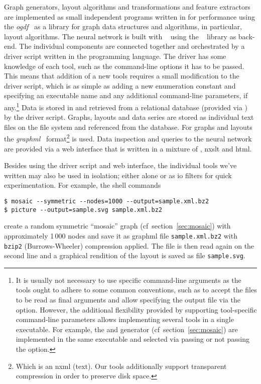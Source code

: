 \documentclass{graphstudy}
\begin{document}
Graph generators, layout algorithms and transformations and feature extractors are implemented as small independent
programs written in {\CXX} for performance using the \emph{\acf{ogdf}}~\cite{OGDF} as a library for graph data
structures and algorithms, in particular, layout algorithms.  The neural network is built with \Keras~\cite{Keras} using
the \TensorFlow~\cite{TensorFlow} library as back-end.  The individual components are connected together and
orchestrated by a driver script written in the {\Python} programming language.  The driver has some knowledge of each
tool, such as the command-line options it has to be passed.  This means that addition of a new tools requires a small
modification to the driver script, which is as simple as adding a new enumeration constant and specifying an executable
name and any additional command-line parameters, if any.\footnote{%
  It is usually not necessary to use specific command-line arguments as the tools ought to adhere to some common
  conventions, such as to accept the files to be read as final arguments and allow specifying the output file via the
   option.  However, the additional flexibility provided by supporting tool-specific
  command-line parameters allows implementing several tools in a single executable.  For example, the  and
   generator (\acs{cf}~\acs{section}~\ref{sec:mosaic}) are implemented in the same executable and selected
  via passing or not passing the  option.
}
Data is stored in and retrieved from a relational database (provided via \SQLite) by the driver script.  Graphs,
layouts and data series are stored as individual text files on the file system and referenced from the database.  For
graphs and layouts the \emph{\acf{graphml}}~\cite{GraphML,GraphMLReport} format\footnote{%
  Which is an \acs{nxml} (text).  Our tools additionally support transparent compression in order to preserve disk
  space.
}
is used.  Data inspection and queries to the neural network are provided via a web interface that is written in a
mixture of {\Python}, \acs{nxslt} {\JavaScript} and \acs{html}.

Besides using the driver script and web interface, the individual tools we've written may also be used in isolation;
either alone or as \acs{io} filters for quick experimentation.  For example, the shell commands
\begin{lstlisting}
$ mosaic --symmetric --nodes=1000 --output=sample.xml.bz2
$ picture --output=sample.svg sample.xml.bz2
\end{lstlisting}
create a random symmetric \enquote{mosaic} graph (\acs{cf}~\acs{section}~\ref{sec:mosaic}) with
approximately 1\,000 nodes and save it as \ac{graphml} file \verb`sample.xml.bz2` with \verb`bzip2` (Burrows-Wheeler)
compression applied.  The file is then read again on the second line and a graphical rendition of the layout is saved as
file \verb`sample.svg`.
\end{document}
